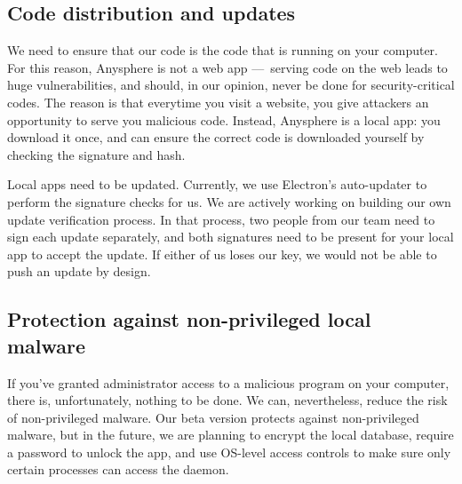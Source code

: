 \subsection{Code distribution and updates}

We need to ensure that our code is the code that is running on your computer. For this reason, Anysphere is not a web app — serving code on the web leads to huge vulnerabilities, and should, in our opinion, never be done for security-critical codes. The reason is that everytime you visit a website, you give attackers an opportunity to serve you malicious code. Instead, Anysphere is a local app: you download it once, and can ensure the correct code is downloaded yourself by checking the signature and hash.


Local apps need to be updated. Currently, we use Electron's auto-updater to perform the signature checks for us. We are actively working on building our own update verification process. In that process, two people from our team need to sign each update separately, and both signatures need to be present for your local app to accept the update. If either of us loses our key, we would not be able to push an update by design.

\subsection{Protection against non-privileged local malware}

If you've granted administrator access to a malicious program on your computer, there is, unfortunately, nothing to be done. We can, nevertheless, reduce the risk of non-privileged malware. Our beta version protects against non-privileged malware, but in the future, we are planning to encrypt the local database, require a password to unlock the app, and use OS-level access controls to make sure only certain processes can access the daemon.

